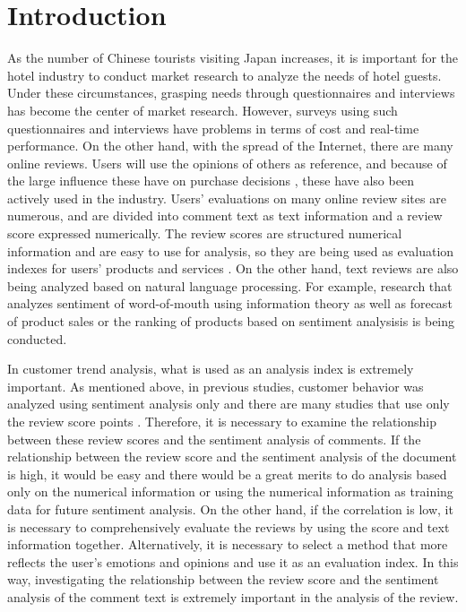 \documentclass[review]{elsarticle}
\begin{document}
\section{Introduction}\label{intro}

As the number of Chinese tourists visiting Japan increases, it is important for the hotel industry to conduct market research to analyze the needs of hotel guests. Under these circumstances, grasping needs through questionnaires and interviews has become the center of market research. However, surveys using such questionnaires and interviews have problems in terms of cost and real-time performance. On the other hand, with the spread of the Internet, there are many online reviews. Users will use the opinions of others as reference, and because of the large influence these have on purchase decisions \cite[][]{VERMEULEN2009123, SPARKS20111310}, these have also been actively used in the industry. Users' evaluations on many online review sites are numerous, and are divided into comment text as text information and a review score expressed numerically. The review scores are structured numerical information and are easy to use for analysis, so they are being used as evaluation indexes for users' products and services \cite[][]{XIE20141, BULCHANDGIDUMAL201344, ZHOU20141}. On the other hand, text reviews are also being analyzed based on natural language processing. For example, research that analyzes sentiment of word-of-mouth using information theory \cite[][]{AMPLAYO201754} as well as forecast of product sales \cite[][]{FAN201790} or the ranking of products based on sentiment analysisis \cite[][]{LIU2017149} is being conducted.

In customer trend analysis, what is used as an analysis index is extremely important. As mentioned above, in previous studies, customer behavior was analyzed using sentiment analysis only \cite[][]{AMPLAYO201754,LIU2017149} and there are many studies that use only the review score points \cite[][]{XIE20141, BULCHANDGIDUMAL201344, ZHOU20141}. Therefore, it is necessary to examine the relationship between these review scores and the sentiment analysis of comments. If the relationship between the review score and the sentiment analysis of the document is high, it would be easy and there would be a great merits to do analysis based only on the numerical information or using the numerical information as training data for future sentiment analysis. On the other hand, if the correlation is low, it is necessary to comprehensively evaluate the reviews by using the score and text information together. Alternatively, it is necessary to select a method that more reflects the user's emotions and opinions and use it as an evaluation index. In this way, investigating the relationship between the review score and the sentiment analysis of the comment text is extremely important in the analysis of the review.
\end{document}
